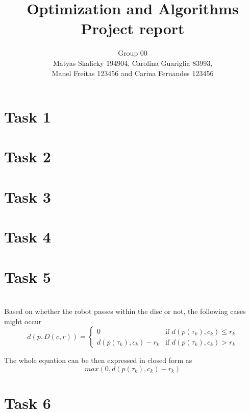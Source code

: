 \documentclass[12pt]{article}
\title{Optimization and Algorithms \\ Project report}
\author{Group 00 \\ Matyas Skalicky 194904, Carolina Guariglia 83993, \\Manel Freitas 123456 and Carina Fernandes 123456}
\date{}
\begin{document}
\maketitle

\section{Task 1}


\section{Task 2}

\section{Task 3}

\section{Task 4}

\section{Task 5}
\noindent{} \\

Based on whether the robot passes within the disc or not, the following cases might occur
\begin{equation}
	d\left( p,D(c,r) \right) = 
	\begin{cases} 
		0				 			& \text{if } d\left(p(\tau_{k}), c_{k}\right) \leq r_{k}\\
		d\left(p(\tau_{k}), c_{k}\right) - r_{k} 	& \text{if } d\left(p(\tau_{k}), c_{k}\right) > r_{k}
	\end{cases}
\end{equation}


The whole equation can be then expressed in closed form as 
\begin{equation}
	\textit{max}\left(0, d\left(p(\tau_{k}), c_{k}\right) - r_{k}\right)
\end{equation}

\section{Task 6}
\end{document}
